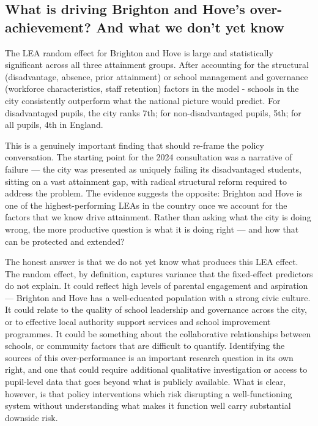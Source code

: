\documentclass[
  12pt,
  titlepage]{article}
\begin{document}
\subsection{What is driving Brighton and Hove's over-achievement? And
what we don't yet
know}\label{what-is-driving-brighton-and-hoves-over-achievement-and-what-we-dont-yet-know}

The LEA random effect for Brighton and Hove is large and statistically
significant across all three attainment groups. After accounting for the
structural (disadvantage, absence, prior attainment) or school
management and governance (workforce characteristics, staff retention)
factors in the model - schools in the city consistently outperform what
the national picture would predict. For disadvantaged pupils, the city
ranks 7th; for non-disadvantaged pupils, 5th; for all pupils, 4th in
England.

This is a genuinely important finding that should re-frame the policy
conversation. The starting point for the 2024 consultation was a
narrative of failure --- the city was presented as uniquely failing its
disadvantaged students, sitting on a vast attainment gap, with radical
structural reform required to address the problem. The evidence suggests
the opposite: Brighton and Hove is one of the highest-performing LEAs in
the country once we account for the factors that we know drive
attainment. Rather than asking what the city is doing wrong, the more
productive question is what it is doing right --- and how that can be
protected and extended?

The honest answer is that we do not yet know what produces this LEA
effect. The random effect, by definition, captures variance that the
fixed-effect predictors do not explain. It could reflect high levels of
parental engagement and aspiration --- Brighton and Hove has a
well-educated population with a strong civic culture. It could relate to
the quality of school leadership and governance across the city, or to
effective local authority support services and school improvement
programmes. It could be something about the collaborative relationships
between schools, or community factors that are difficult to quantify.
Identifying the sources of this over-performance is an important
research question in its own right, and one that could require
additional qualitative investigation or access to pupil-level data that
goes beyond what is publicly available. What is clear, however, is that
policy interventions which risk disrupting a well-functioning system
without understanding what makes it function well carry substantial
downside risk.
\end{document}
